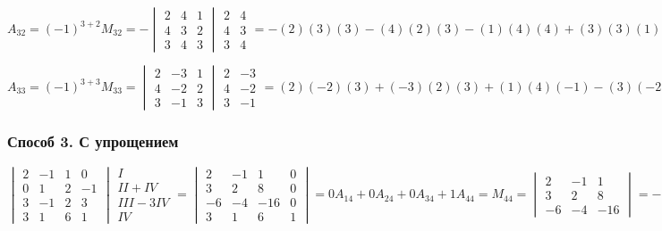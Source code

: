 \documentclass{article}
\begin{document}
$
A_{32} = (-1)^{3+2} M_{32} =
-\begin{vmatrix}
	2 & 4 & 1 \\
	4 & 3 & 2 \\
	3 & 4 & 3
\end{vmatrix}
\begin{matrix}
	2 & 4 \\
	4 & 3 \\
	3 & 4
\end{matrix}
= -(2)(3)(3) - (4)(2)(3) - (1)(4)(4)
+ (3)(3)(1) + (4)(2)(2) + (3)(4)(4) =
-(18 + 24 + 16 - 9 - 16 - 48) = 15
$

$
A_{33} = (-1)^{3+3} M_{33} =
\begin{vmatrix}
	2 & -3 & 1 \\
	4 & -2 & 2 \\
	3 & -1 & 3
\end{vmatrix}
\begin{matrix}
	2 & -3 \\
	4 & -2 \\
	3 & -1
\end{matrix}
= (2)(-2)(3) + (-3)(2)(3) + (1)(4)(-1)
- (3)(-2)(1) - (-1)(2)(2) - (3)(4)(-3) = ...
$

\subsubsection{Способ 3. С упрощением}

$
\begin{vmatrix}
	2 & -1 & 1 & 0 \\
	0 & 1 & 2 & -1 \\
	3 & -1 & 2 & 3 \\
	3 & 1 & 6 & 1
\end{vmatrix}
\begin{matrix}
	I \\
	II + IV \\
	III - 3IV \\
	IV
\end{matrix}
=
\begin{vmatrix}
	2 & -1 & 1 & 0 \\
	3 & 2 & 8 & 0 \\
	-6 & -4 & -16 & 0 \\
	3 & 1 & 6 & 1
\end{vmatrix}
= 0 A_{14} + 0 A_{24} + 0 A_{34} + 1 A_{44} =
M_{44} =
\begin{vmatrix}
	2 & -1 & 1 \\
	3 & 2 & 8 \\
	-6 & -4 & -16
\end{vmatrix}
= -2 * \begin{vmatrix}
	2 & -1 & 1 \\
	3 & 2 & 8 \\
	3 & 2 & 8
\end{vmatrix}
= -2 * 0 = 0
$
\end{document}
